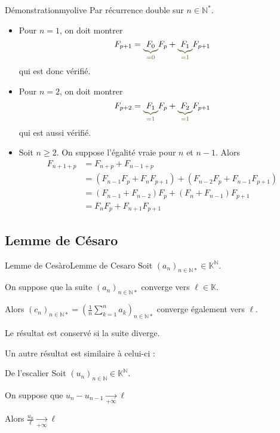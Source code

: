     \begin{demo}{Démonstration}{myolive}
        Par récurrence double sur $n \in \mathbb{N}^*$.
        \begin{itemize}
            \item Pour $n = 1$, on doit montrer \[ F_{p+1} = \textcolor{myolive}{\underbrace{\textcolor{black}{F_0}}_{=0}} F_p + \textcolor{myolive}{\underbrace{\textcolor{black}{F_1}}_{=1}} F_{p+1} \] qui est donc vérifié.
            \item Pour $n = 2$, on doit montrer \[ F_{p+2} = \textcolor{myolive}{\underbrace{\textcolor{black}{F_1}}_{=1}} F_p + \textcolor{myolive}{\underbrace{\textcolor{black}{F_2}}_{=1}} F_{p+1} \] qui est aussi vérifié.
            \item Soit $n \geq 2$. On suppose l’égalité vraie pour $n$ et $n-1$. Alors 
            \begin{align*}
                F_{n+1+p} &= F_{n+p} + F_{n-1+p} \\
                &= (F_{n-1} F_p + F_n F_{p+1}) + (F_{n-2}F_p + F_{n-1}F_{p+1}) \\
                &= (F_{n-1} + F_{n-2})F_p + (F_n + F_{n-1})F_{p+1} \\
                &= F_n F_p + F_{n+1}F_{p+1}
            \end{align*}
        \end{itemize}
    \end{demo}

\subsection{Lemme de Césaro}

    \begin{lem}{Lemme de Cesàro}{Lemme de Cesaro}
        Soit $(a_n)_{n \in \mathbb{N*}} \in \mathbb{K}^{\mathbb{N}}$.
        
        On suppose que la suite $(a_n)_{n \in \mathbb{N*}}$ converge vers $\ell \in \mathbb{K}$.
        
        Alors $(c_n)_{n \in \mathbb{N*}} = \left(\frac{1}{n} \sum\limits_{k=1}^n a_k\right)_{n \in \mathbb{N*}}$ converge également vers $\ell$. 
        
        Le résultat est conservé si la suite diverge.
    \end{lem}

    Un autre résultat est similaire à celui-ci :

    \begin{lem}{De l’escalier}{}
        Soit $(u_n)_{n \in \mathbb{N}} \in \mathbb{K}^{\mathbb{N}}$.
        
        On suppose que $u_n - u_{n-1} \underset{+\infty}{\longrightarrow} \ell$
    
        Alors $\frac{u_n}{\ell} \underset{+\infty}{\longrightarrow} \ell$
    \end{lem}

